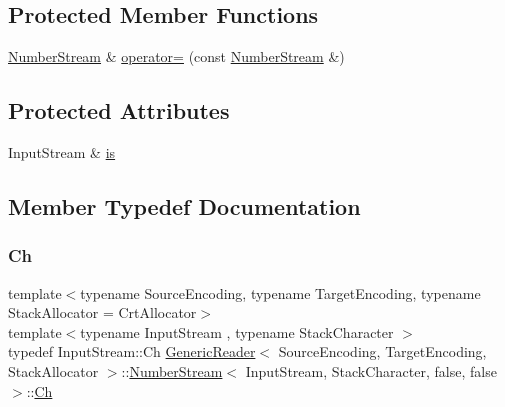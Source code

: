 \subsection*{Protected Member Functions}
\begin{DoxyCompactItemize}
\item 
\hyperlink{classGenericReader_1_1NumberStream}{Number\+Stream} \& \hyperlink{classGenericReader_1_1NumberStream_3_01InputStream_00_01StackCharacter_00_01false_00_01false_01_4_acb2efacd314d67c3a3c149c481d58af8}{operator=} (const \hyperlink{classGenericReader_1_1NumberStream}{Number\+Stream} \&)
\end{DoxyCompactItemize}
\subsection*{Protected Attributes}
\begin{DoxyCompactItemize}
\item 
Input\+Stream \& \hyperlink{classGenericReader_1_1NumberStream_3_01InputStream_00_01StackCharacter_00_01false_00_01false_01_4_a757fc771328ce94b28df424a32e6407a}{is}
\end{DoxyCompactItemize}


\subsection{Member Typedef Documentation}
\mbox{\label{classGenericReader_1_1NumberStream_3_01InputStream_00_01StackCharacter_00_01false_00_01false_01_4_a2971d286306cf8df899b87ea9dd24f27}} 
\subsubsection{\texorpdfstring{Ch}{Ch}}
{\footnotesize\ttfamily template$<$typename Source\+Encoding, typename Target\+Encoding, typename Stack\+Allocator = Crt\+Allocator$>$ \\
template$<$typename Input\+Stream , typename Stack\+Character $>$ \\
typedef Input\+Stream\+::\+Ch \hyperlink{classGenericReader}{Generic\+Reader}$<$ Source\+Encoding, Target\+Encoding, Stack\+Allocator $>$\+::\hyperlink{classGenericReader_1_1NumberStream}{Number\+Stream}$<$ Input\+Stream, Stack\+Character, false, false $>$\+::\hyperlink{classGenericReader_1_1NumberStream_3_01InputStream_00_01StackCharacter_00_01false_00_01false_01_4_a2971d286306cf8df899b87ea9dd24f27}{Ch}}



